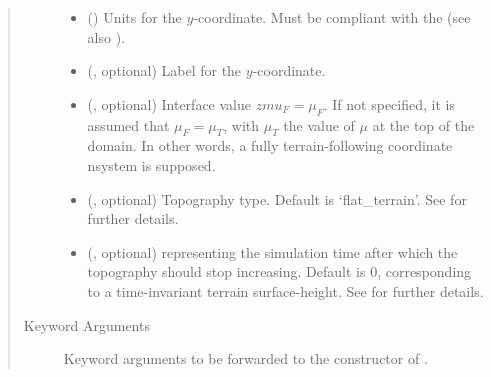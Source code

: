 \documentclass[letterpaper,10pt,english]{sphinxmanual}
\begin{document}
\begin{fulllineitems}
\begin{fulllineitems}
\begin{quote}
\begin{description}
\begin{itemize}
\item {} 
\sphinxstyleliteralstrong{, } () \textendash{} 
Units for the \(y\)-coordinate. Must be compliant with the 
(see also {\hyperref[\detokenize{api:grids.axis.Axis.__init__}]{}}).


\item {} 
 (, optional) \textendash{} Label for the \(y\)-coordinate.

\item {} 
 (, optional) \textendash{} Interface value \(zmu_F = \mu_F\). If not specified, it is assumed that \(\mu_F = \mu_T\), with
\(\mu_T\) the value of \(\mu\) at the top of the domain. In other words, a fully terrain-following
coordinate nsystem is supposed.

\item {} 
 (, optional) \textendash{} Topography type. Default is ‘flat\_terrain’. See {\hyperref[\detokenize{api:module-grids.topography}]{}} for further details.

\item {} 
 (, optional) \textendash{}  representing the simulation time after which the topography should stop increasing.
Default is 0, corresponding to a time-invariant terrain surface-height. See {\hyperref[\detokenize{api:module-grids.topography}]{}} for further
details.

\end{itemize}

\item[{Keyword Arguments}] \leavevmode
{} \textendash{} Keyword arguments to be forwarded to the constructor of {\hyperref[\detokenize{api:grids.topography.Topography2d}]{}}.

\end{description}\end{quote}

\end{fulllineitems}


\end{fulllineitems}
\end{document}
